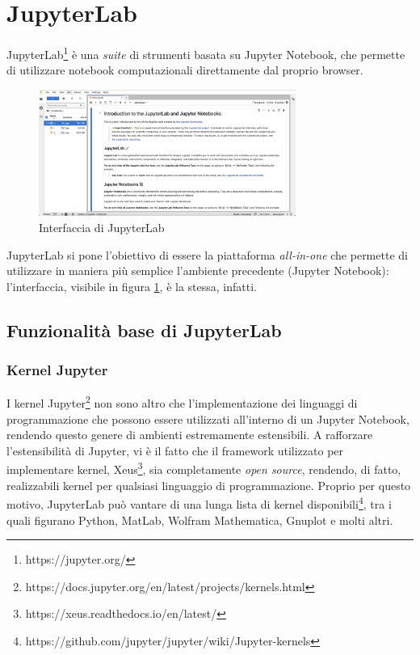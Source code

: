 \section{JupyterLab}
JupyterLab\footnote{https://jupyter.org/} è una \textit{suite} di strumenti basata su Jupyter Notebook, che permette di utilizzare notebook computazionali direttamente dal proprio browser.
\begin{figure}[h]
    \centering
    \includegraphics[width=0.75\textwidth]{images/jupyter-hub-1.png}
    \caption{Interfaccia di JupyterLab}
    \label{fig:jupyter-interface-1}
\end{figure}
\newline
JupyterLab si pone l'obiettivo di essere la piattaforma \textit{all-in-one} che permette di utilizzare in maniera più semplice l'ambiente precedente (Jupyter Notebook): l'interfaccia, visibile in figura \ref{fig:jupyter-interface-1}, è la stessa, infatti. 

\subsection{Funzionalità base di JupyterLab}
\subsubsection{Kernel Jupyter}
I kernel Jupyter\footnote{https://docs.jupyter.org/en/latest/projects/kernels.html} non sono altro che l'implementazione dei linguaggi di programmazione che possono essere utilizzati all'interno di un Jupyter Notebook, rendendo questo genere di ambienti estremamente estensibili. A rafforzare l'estensibilità di Jupyter, vi è il fatto che il framework utilizzato per implementare kernel, Xeus\footnote{https://xeus.readthedocs.io/en/latest/}, sia completamente \textit{open source}, rendendo, di fatto, realizzabili kernel per qualsiasi linguaggio di programmazione. Proprio per questo motivo, JupyterLab può vantare di una lunga lista di kernel disponibili\footnote{https://github.com/jupyter/jupyter/wiki/Jupyter-kernels}, tra i quali figurano Python, MatLab, Wolfram Mathematica, Gnuplot e molti altri.

